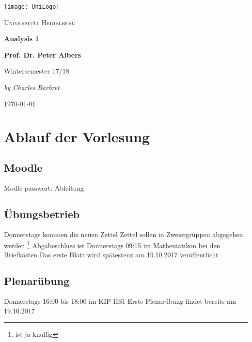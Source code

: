 \documentclass[12pt,a4paper]{article} %
\begin{document}
	\begin{titlepage} %
	\centering
	\texttt{[image: UniLogo]}\par\vspace{1cm}
		{\scshape\LARGE Universität Heidelberg \par}
		\vspace{1cm}
		{\Huge\bfseries Analysis 1 \par}
		\vspace{1cm}
		{\LARGE\bfseries Prof. Dr. Peter Albers \par}
		\vspace{1cm}
		{\huge Wintersemester 17/18 \par}
		\vspace{2cm}
		{\Large\itshape by Charles Barbret \par}
		
		\vfill

		{\large \gerDate\today\par}
	\end{titlepage}

\tableofcontents %
\newpage %


\section*{Ablauf der Vorlesung}
\subsection{Moodle}
Modle passwort: Ableitung
\subsection{Übungsbetrieb}
Donnerstags kommen die neuen Zettel \newline
Zettel sollen in Zweiergruppen abgegeben werden \footnote{ist ja knuffig} \newline
Abgabeschluss ist Donnerstags 09:15 im Mathematikon bei den Briefkästen \newline
Das erste Blatt wird spätestenz am 19.10.2017 veröffentlicht 

\subsection{Plenarübung}
Donnerstags 16:00 bis 18:00 im KIP HS1 \newline
Erste Plenarübung findet bereits am 19.10.2017
\end{document}
